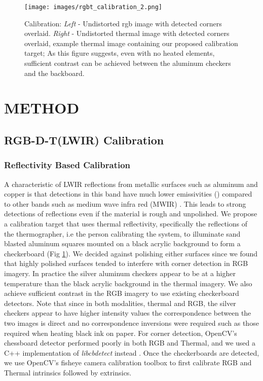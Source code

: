 \documentclass[letterpaper, 10 pt, conference]{ieeeconf}
\begin{document}
\begin{figure}[t]
\begin{center}
\vspace{0.15cm}
\texttt{[image: images/rgbt\_calibration\_2.png]}
\vspace{-0.25cm}
\end{center}
   \caption{Calibration: \textit{Left} - Undistorted rgb image with detected corners overlaid. \textit{Right} - Undistorted thermal image with detected corners overlaid, example thermal image containing our proposed calibration target; As this figure suggests, even with no heated elements, sufficient contrast can be achieved between the aluminum checkers and the backboard.}
\label{fig:rgbt_calibration}
\vspace{-0.45cm}
\end{figure} 
\section{METHOD}

\subsection{RGB-D-T(LWIR) Calibration}

\subsubsection{Reflectivity Based Calibration}

A characteristic of LWIR reflections from metallic surfaces such as aluminum and copper is that detections in this band have much lower emissivities () compared to other bands such as medium wave infra red (MWIR) \cite{vollmer2017infrared}. This leads to strong detections of reflections  even if the material is rough and unpolished. We propose a calibration target that uses thermal reflectivity, specifically the reflections of the thermographer, i.e the person calibrating the system, to illuminate sand blasted aluminum squares mounted on a black acrylic background to form a checkerboard (Fig \ref{fig:rgbt_calibration}). We decided against polishing either surfaces since we found that highly polished surfaces tended to interfere with corner detection in RGB imagery. In practice the silver aluminum checkers appear to be at a higher temperature than the black acrylic background in the thermal imagery. We also achieve sufficient contrast in the RGB imagery to use existing checkerboard detectors. 
Note that since in both modalities, thermal and RGB, the silver checkers appear to have higher intensity values the correspondence between the two images is direct and no correspondence inversions were required such as those required when heating black ink on paper. For corner detection, OpenCV's chessboard detector performed poorly in both RGB and Thermal, and we used a C++ implementation of \textit{libcbdetect} instead \cite{geiger2012automatic}. Once the checkerboards are detected, we use OpenCV's fisheye camera calibration toolbox to first calibrate RGB and Thermal intrinsics followed by extrinsics. 
\end{document}
